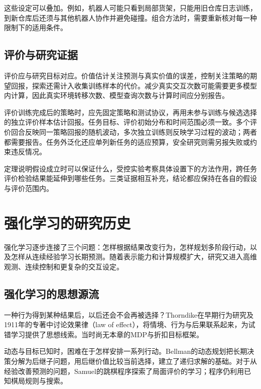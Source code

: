 这些设定可以叠加。例如，机器人可能只看到局部货架，只能用旧仓库日志训练，到新仓库后还须与其他机器人协作并避免碰撞。组合方法时，需要重新核对每一种限制下的适用条件。

\subsection{评价与研究证据}
\label{sec:rl-overview-evidence}

评价应与研究目标对应。价值估计关注预测与真实价值的误差，控制关注策略的期望回报，探索还需计入收集训练样本的代价。减少真实交互次数可能需要更多模型内计算，因此真实环境转移次数、模型查询次数与计算时间应分别报告。

评价训练完成后的策略时，应先固定策略和测试协议，再用未参与训练与候选选择的独立评价样本估计回报。任务目标、评价初始分布和时间范围必须一致。多个评价回合反映同一策略回报的随机波动，多次独立训练则反映学习过程的波动；两者都需要报告。任务外泛化还应单列新任务的适应预算，安全研究则需另报失败或约束违反情况。

定理说明假设成立时可以保证什么，受控实验考察具体设置下的方法作用，跨任务评价检验结果能延伸到哪些任务。三类证据相互补充，结论都应保持在各自的假设与评价范围内。

\section{强化学习的研究历史}
\label{sec:rl-overview-history}

强化学习逐步连接了三个问题：怎样根据结果改变行为，怎样规划多阶段行动，以及怎样从连续经验学习长期预测。随着表示能力和计算规模扩大，研究又进入高维观测、连续控制和更复杂的交互设定。

\subsection{强化学习的思想源流}
\label{sec:rl-overview-origins}

一种行为得到某种结果后，以后还会不会再被选择？Thorndike在早期行为研究及1911年的专著中讨论效果律（law of effect），将情境、行为与后果联系起来，为试错学习提供了思想线索。当时尚无本章的MDP与折扣目标框架。

动态与目标已知时，困难在于怎样安排一系列行动。Bellman的动态规划把长期决策分解为后继子问题，用后继价值比较当前选择，建立了递归求解的基础。对于从经验改善预测的问题，Samuel的跳棋程序探索了局面评价的学习；程序仍利用已知棋局规则与搜索。


